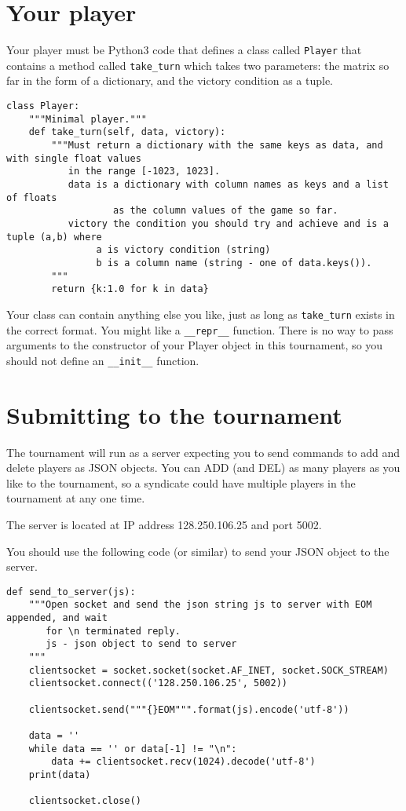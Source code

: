 \documentclass{article}
\begin{document}
\section{Your player}

Your player must be Python3 code that defines a class called {\tt Player}
that contains a method called {\tt take\_turn}
which takes two parameters: the matrix so far in the form of a dictionary, and the victory condition as a tuple.

\begin{verbatim}
class Player:
    """Minimal player."""
    def take_turn(self, data, victory):
        """Must return a dictionary with the same keys as data, and with single float values 
           in the range [-1023, 1023].
           data is a dictionary with column names as keys and a list of floats 
                   as the column values of the game so far.
           victory the condition you should try and achieve and is a tuple (a,b) where 
                a is victory condition (string) 
                b is a column name (string - one of data.keys()).
        """
        return {k:1.0 for k in data}
\end{verbatim}

Your class can contain anything else you like, just as long as {\tt take\_turn} 
exists in the correct format.
You might like a {\tt \_\_repr\_\_} function.
There is no way to pass arguments to the constructor of your Player object in this tournament, so you 
should not define an {\tt \_\_init\_\_} function.


\section{Submitting to the tournament}

The tournament will run as a server expecting you to send commands
to add and delete players as JSON objects. You can ADD (and DEL) as many players as you
like to the tournament, so a syndicate could have multiple players in the tournament at
any one time.

The server is located at IP address 128.250.106.25 and port 5002.

You should use the following code (or similar) to send your JSON object to the server.

\begin{verbatim}
def send_to_server(js):
    """Open socket and send the json string js to server with EOM appended, and wait 
       for \n terminated reply.
       js - json object to send to server
    """
    clientsocket = socket.socket(socket.AF_INET, socket.SOCK_STREAM)
    clientsocket.connect(('128.250.106.25', 5002))

    clientsocket.send("""{}EOM""".format(js).encode('utf-8'))

    data = ''
    while data == '' or data[-1] != "\n":
        data += clientsocket.recv(1024).decode('utf-8')
    print(data)

    clientsocket.close()
\end{verbatim}
\end{document}
